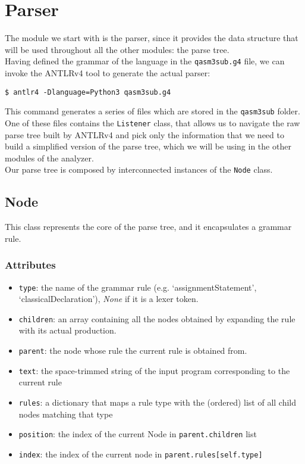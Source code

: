 \documentclass[12pt,a4paper]{report}
\theoremstyle{definition}
\theoremstyle{definition}
\theoremstyle{definition}
\begin{document}
\section{Parser}
The module we start with is the parser, since it provides the data structure that will be used throughout all the other modules: the parse tree.\\
Having defined the grammar of the language in the \texttt{qasm3sub.g4} file, we can invoke the ANTLRv4 tool \cite{antlr} to generate the actual parser:
\begin{lstlisting}
$ antlr4 -Dlanguage=Python3 qasm3sub.g4
\end{lstlisting}
This command generates a series of files which are stored in the \texttt{qasm3sub} folder. One of these files contains the \texttt{Listener} class, that allows us to navigate the raw parse tree built by ANTLRv4 and pick only the information that we need to build a simplified version of the parse tree, which we will be using in the other modules of the analyzer.\\
Our parse tree is composed by interconnected instances of the \texttt{Node} class.

\subsection{Node}
This class represents the core of the parse tree, and it encapsulates a grammar rule.
\subsubsection{Attributes}
\begin{itemize}
    \itemsep 0em
    \item \texttt{type}: the name of the grammar rule (e.g. `assignmentStatement', `classicalDeclaration'), \textit{None} if it is a lexer token.
    \item \texttt{children}: an array containing all the nodes obtained by expanding the rule with its actual production.
    \item \texttt{parent}: the node whose rule the current rule is obtained from.
    \item \texttt{text}: the space-trimmed string of the input program corresponding to the current rule
    \item \texttt{rules}: a dictionary that maps a rule type with the (ordered) list of all child nodes matching that type
    \item \texttt{position}: the index of the current Node in \texttt{parent.children} list
    \item \texttt{index}: the index of the current node in \texttt{parent.rules[self.type]}
\end{itemize}
\end{document}
